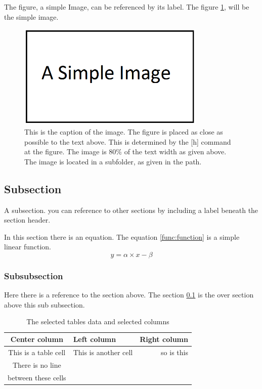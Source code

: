 \documentclass[a4paper,11pt]{article}
\begin{document}
The figure, a simple Image, can be referenced by its label. The figure \ref{fig:simpleImage}, will be the simple image.

\begin{figure}[h]
    \centering
    \includegraphics[width=0.8\textwidth]{Images/SimpleImage.png}
    \caption{This is the caption of the image. The figure is placed as close as possible to the text above. This is determined by the [h] command at the figure. The image is 80\% of the text width as given above. The image is located in a subfolder, as given in the path.}
    \label{fig:simpleImage}
\end{figure}

\subsection{Subsection}
\label{sec:subsection}
A subsection. you can reference to other sections by including a label beneath the section header.

In this section there is an equation. The equation \ref{func:function} is a simple linear function.
\begin{equation}
	y = \alpha \times x -\beta
	\label{func:function}
\end{equation}
\subsubsection{Subsubsection}
Here there is a reference to the section above. The section \ref{sec:subsection} is the over section above this sub subsection.

\begin{table}[h]
\centering
	\begin{tabular}{|c|l|r}
		\hline
		Center column & Left column & Right column\\ 
		\hline
		This is a table cell & This is another cell & so is this \\
		\hline
		There is no line & & \\
		between these cells & & \\		
		\hline
	\end{tabular}
	\caption{The selected tables data and selected columns}
	\label{Tab:simTab}
\end{table}
\end{document}
